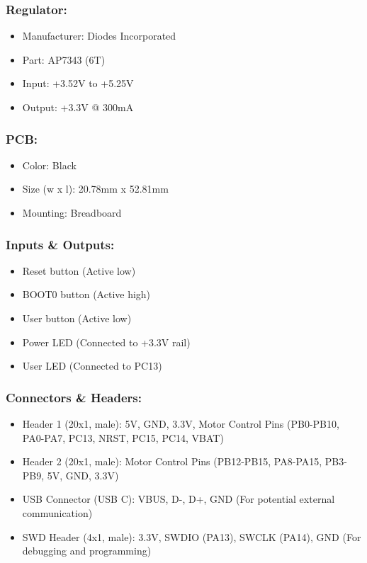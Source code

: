     \subsubsection{Regulator:}
    \begin{itemize}
        \item Manufacturer: Diodes Incorporated
        \item Part: AP7343 (6T)
        \item Input: +3.52V to +5.25V
        \item Output: +3.3V @ 300mA
    \end{itemize}

    \subsubsection{PCB:}
    \begin{itemize}
        \item Color: Black
        \item Size (w x l): 20.78mm x 52.81mm
        \item Mounting: Breadboard
    \end{itemize}

    \subsubsection{Inputs \& Outputs:}
    \begin{itemize}
        \item Reset button (Active low)
        \item BOOT0 button (Active high)
        \item User button (Active low)
        \item Power LED (Connected to +3.3V rail)
        \item User LED (Connected to PC13)
    \end{itemize}

    \subsubsection{Connectors \& Headers:}
    \begin{itemize}
        \item Header 1 (20x1, male): 5V, GND, 3.3V, Motor Control Pins (PB0-PB10, PA0-PA7, PC13, NRST, PC15, PC14, VBAT)
        \item Header 2 (20x1, male): Motor Control Pins (PB12-PB15, PA8-PA15, PB3-PB9, 5V, GND, 3.3V)
        \item USB Connector (USB C): VBUS, D-, D+, GND (For potential external communication)
        \item SWD Header (4x1, male): 3.3V, SWDIO (PA13), SWCLK (PA14), GND (For debugging and programming)
    \end{itemize}

